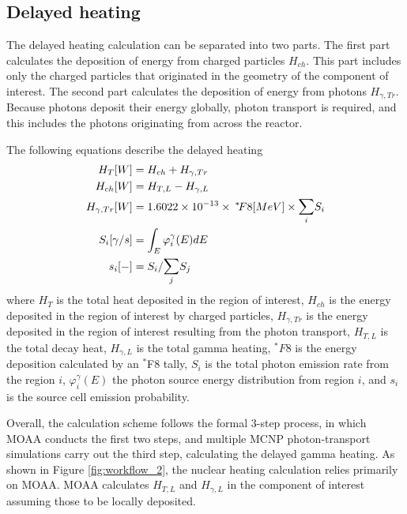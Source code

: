 \documentclass{style/nseJournal}
\begin{document}
\subsection{Delayed heating}

The delayed heating calculation can be separated into two parts.
The first part calculates the deposition of energy from charged particles $H_{ch}$.
This part includes only the charged particles that originated in the geometry of the component of interest.
The second part calculates the deposition of energy from photons $H_{\gamma, Tr}$.
Because photons deposit their energy globally, photon transport is required, and this includes the photons originating from across the reactor.

The following equations describe the delayed heating
\begin{align}
H_{T} [W] &= H_{ch} + H_{\gamma, Tr}  \label{eq-heat} \\
H_{ch} [W] &= H_{T, L} - H_{\gamma, L} \\
H_{\gamma, Tr} [W] &= 1.6022 \times 10^{-13} \times \: ^* \! F8 [MeV] \times \mathlarger{\sum}_i S_i \label{eq-ga-tr} \\
S_i[\gamma/s] &= \int_{E} \varphi^\gamma_i(E) dE \\
s_i [-] &= S_i / \mathlarger{\sum}_j S_j \label{eq-emiprob}
\end{align}
where $H_{T}$ is the total heat deposited in the region of interest, $H_{ch}$ is the energy deposited in the region of interest by charged particles, $H_{\gamma, Tr}$ is the energy deposited in the region of interest resulting from the photon transport, $H_{T,L}$ is the total decay heat, $H_{\gamma, L}$ is the total gamma heating, $^\ast F8$ is the energy deposition calculated by an $^\ast$F8 tally, $S_i$ is the total photon emission rate from the region $i$, $\varphi^\gamma_i(E)$ the photon source energy distribution from region $i$, and $s_i$ is the source cell emission probability.

Overall, the calculation scheme follows the formal 3-step process, in which MOAA conducts the first two steps, and multiple MCNP photon-transport simulations carry out the third step, calculating the delayed gamma heating.
As shown in Figure \ref{fig:workflow_2}, the nuclear heating calculation relies primarily on MOAA.
MOAA calculates $H_{T,L}$ and $H_{\gamma, L}$ in the component of interest assuming those to be locally deposited.
\end{document}
